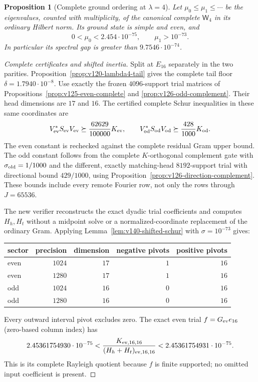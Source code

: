 \documentclass[11pt]{article}
\newtheorem{proposition}[theorem]{Proposition}
\theoremstyle{remark}
\begin{document}
\begin{proposition}[Complete ground ordering at $\lambda=4$]
\label{prop:v140-ground4}
Let $\mu_0\le\mu_1\le\cdots$ be the eigenvalues, counted with
multiplicity, of the canonical complete $\mathsf W_4$ in its ordinary
Hilbert norm. Its ground state is simple and even, and
\begin{equation}\label{eq:v140-ground4-bounds}
 0<\mu_0<2.454\cdot10^{-75},\qquad \mu_1>10^{-73}.
\end{equation}
In particular its spectral gap is greater than $9.7546\cdot10^{-74}$.
\end{proposition}
\begin{proof}[Complete certificates and shifted inertia]
Split at $E_{16}$ separately in the two parities.
Proposition~\ref{prop:v120-lambda4-tail} gives the complete tail floor
$\delta=1.7940\cdot10^{-8}$. Use exactly the frozen $4096$-support
trial matrices of Propositions~\ref{prop:v125-even-complete} and
\ref{prop:v126-odd-complement}. Their head dimensions are $17$ and
$16$. The certified complete Schur inequalities in these same
coordinates are
\[
 V_{\rm ev}^*S_{\rm ev}V_{\rm ev}\succeq
       \frac{62629}{100000}K_{\rm ev},\qquad
 V_{\rm od}^*S_{\rm od}V_{\rm od}\succeq
       \frac{428}{1000}K_{\rm od}.
\]
The even constant is rechecked against the complete residual Gram
upper bound. The odd constant follows from the complete
$K$-orthogonal complement gate with $\sigma_{\rm old}=1/1000$
and the different, exactly matching-head $8192$-support trial with
directional bound $429/1000$, using
Proposition~\ref{prop:v126-direction-complement}. These bounds include
every remote Fourier row, not only the rows through $J=65536$.

The new verifier reconstructs the exact dyadic trial coefficients
and computes $H_h,H_t$ without a midpoint solve or a normalized-coordinate
replacement of the ordinary Gram. Applying
Lemma~\ref{lem:v140-shifted-schur} with $\sigma=10^{-73}$ gives:
\begin{center}
\begin{tabular}{lrrrr}
\toprule
sector & precision & dimension & negative pivots & positive pivots\\
\midrule
even & $1024$ & $17$ & $1$ & $16$\\
even & $1280$ & $17$ & $1$ & $16$\\
odd & $1024$ & $16$ & $0$ & $16$\\
odd & $1280$ & $16$ & $0$ & $16$\\
\bottomrule
\end{tabular}
\end{center}
Every outward interval pivot excludes zero. The exact even trial
$f=G_{\rm ev}e_{16}$ (zero-based column index) has
\[
 2.45361754930\cdot10^{-75}
 <\frac{K_{{\rm ev},16,16}}{(H_h+H_t)_{{\rm ev},16,16}}
 <2.45361754931\cdot10^{-75}.
\]
This is its complete Rayleigh quotient because $f$ is finite
supported; no omitted input coefficient is present.


\end{proof}
\end{document}
